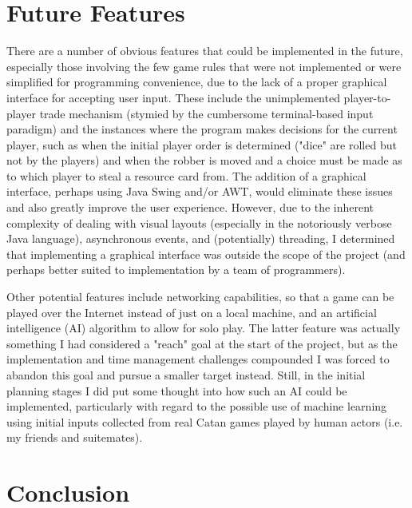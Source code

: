 \documentclass[pageno]{jpaper}
\begin{document}
\begin{doublespacing}
\hypertarget{sec:future_features}{}
\section{Future Features}

There are a number of obvious features that could be implemented in the future, especially those involving the few game rules that were not implemented or were simplified for programming convenience, due to the lack of a proper graphical interface for accepting user input. These include the unimplemented player-to-player trade mechanism (stymied by the cumbersome terminal-based input paradigm) and the instances where the program makes decisions for the current player, such as when the initial player order is determined ("dice" are rolled but not by the players) and when the robber is moved and a choice must be made as to which player to steal a resource card from. The addition of a graphical interface, perhaps using Java Swing and/or AWT, would eliminate these issues and also greatly improve the user experience. However, due to the inherent complexity of dealing with visual layouts (especially in the notoriously verbose Java language), asynchronous events, and (potentially) threading, I determined that implementing a graphical interface was outside the scope of the project (and perhaps better suited to implementation by a team of programmers).

Other potential features include networking capabilities, so that a game can be played over the Internet instead of just on a local machine, and an artificial intelligence (AI) algorithm to allow for solo play. The latter feature was actually something I had considered a "reach" goal at the start of the project, but as the implementation and time management challenges compounded I was forced to abandon this goal and pursue a smaller target instead. Still, in the initial planning stages I did put some thought into how such an AI could be implemented, particularly with regard to the possible use of machine learning using initial inputs collected from real Catan games played by human actors (i.e. my friends and suitemates).

\hypertarget{sec:conclusion}{}
\section{Conclusion}


\end{doublespacing}
\end{document}
